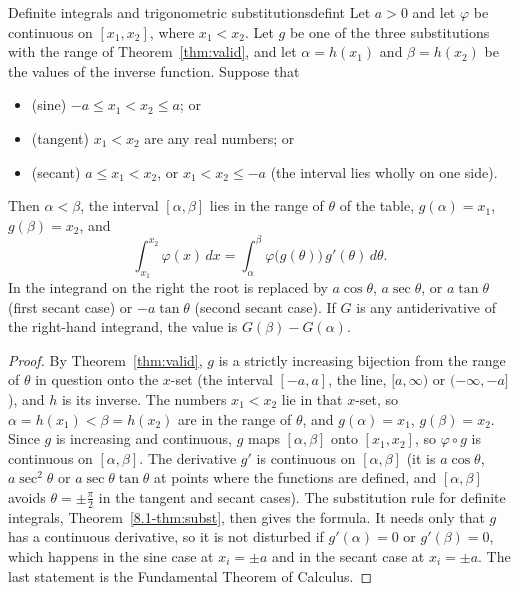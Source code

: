 \documentclass[11pt]{article}
\begin{document}
\begin{thm}{Definite integrals and trigonometric substitutions}{defint}
Let $a>0$ and let $\varphi$ be continuous on $[x_1,x_2]$, where $x_1<x_2$. Let $g$ be one of the three substitutions with the range of Theorem~\ref{thm:valid}, and let $\alpha=h(x_1)$ and $\beta=h(x_2)$ be the values of the inverse function. Suppose that
\begin{itemize}
  \item (sine) $-a\le x_1<x_2\le a$; or
  \item (tangent) $x_1<x_2$ are any real numbers; or
  \item (secant) $a\le x_1<x_2$, or $x_1<x_2\le-a$ (the interval lies wholly on one side).
\end{itemize}
Then $\alpha<\beta$, the interval $[\alpha,\beta]$ lies in the range of $\theta$ of the table, $g(\alpha)=x_1$, $g(\beta)=x_2$, and
\[\int_{x_1}^{x_2}\varphi(x)\,dx=\int_\alpha^\beta\varphi\big(g(\theta)\big)\,g'(\theta)\,d\theta .\]
In the integrand on the right the root is replaced by $a\cos\theta$, $a\sec\theta$, or $a\tan\theta$ (first secant case) or $-a\tan\theta$ (second secant case). If $G$ is any antiderivative of the right-hand integrand, the value is $G(\beta)-G(\alpha)$.
\end{thm}
\begin{proof}
By Theorem~\ref{thm:valid}, $g$ is a strictly increasing bijection from the range of $\theta$ in question onto the $x$-set (the interval $[-a,a]$, the line, $[a,\infty)$ or $(-\infty,-a]$), and $h$ is its inverse. The numbers $x_1<x_2$ lie in that $x$-set, so $\alpha=h(x_1)<\beta=h(x_2)$ are in the range of $\theta$, and $g(\alpha)=x_1$, $g(\beta)=x_2$. Since $g$ is increasing and continuous, $g$ maps $[\alpha,\beta]$ onto $[x_1,x_2]$, so $\varphi\circ g$ is continuous on $[\alpha,\beta]$. The derivative $g'$ is continuous on $[\alpha,\beta]$ (it is $a\cos\theta$, $a\sec^2\theta$ or $a\sec\theta\tan\theta$ at points where the functions are defined, and $[\alpha,\beta]$ avoids $\theta=\pm\frac\pi2$ in the tangent and secant cases). The substitution rule for definite integrals, Theorem~\ref{8.1-thm:subst}, then gives the formula. It needs only that $g$ has a continuous derivative, so it is not disturbed if $g'(\alpha)=0$ or $g'(\beta)=0$, which happens in the sine case at $x_i=\pm a$ and in the secant case at $x_i=\pm a$. The last statement is the Fundamental Theorem of Calculus.
\end{proof}
\end{document}
